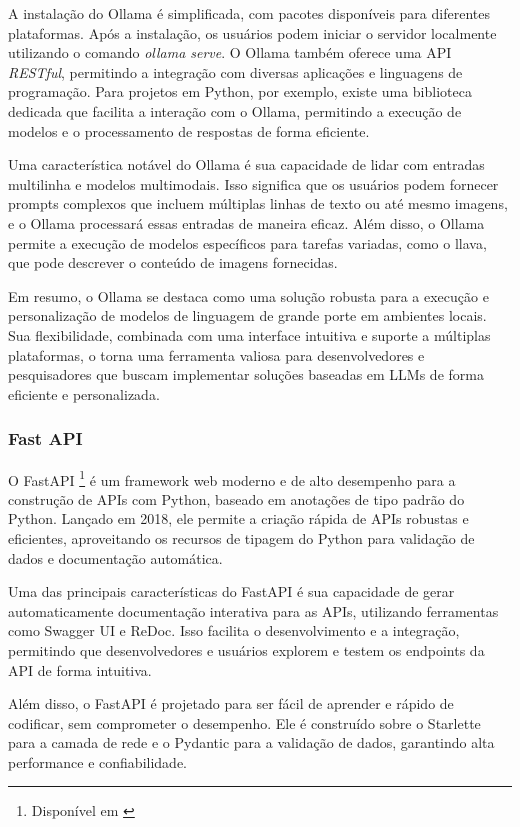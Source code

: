 \documentclass[a4paper, 12pt]{article}
\newcommand{\citeb}[1]{\bibleftbracket\cite{#1}\bibrightbracket}
\begin{document}
    A instalação do Ollama é simplificada, com pacotes disponíveis para diferentes plataformas. Após a instalação, os usuários podem iniciar o servidor localmente utilizando o comando \textit{ollama serve}. O Ollama também oferece uma API \textit{RESTful}, permitindo a integração com diversas aplicações e linguagens de programação. Para projetos em Python, por exemplo, existe uma biblioteca dedicada que facilita a interação com o Ollama, permitindo a execução de modelos e o processamento de respostas de forma eficiente.

    Uma característica notável do Ollama é sua capacidade de lidar com entradas multilinha e modelos multimodais. Isso significa que os usuários podem fornecer prompts complexos que incluem múltiplas linhas de texto ou até mesmo imagens, e o Ollama processará essas entradas de maneira eficaz. Além disso, o Ollama permite a execução de modelos específicos para tarefas variadas, como o llava, que pode descrever o conteúdo de imagens fornecidas.

    Em resumo, o Ollama se destaca como uma solução robusta para a execução e personalização de modelos de linguagem de grande porte em ambientes locais. Sua flexibilidade, combinada com uma interface intuitiva e suporte a múltiplas plataformas, o torna uma ferramenta valiosa para desenvolvedores e pesquisadores que buscam implementar soluções baseadas em LLMs de forma eficiente e personalizada.

    \subsubsection{Fast API} \label{sec:fastapi}

    O FastAPI \footnote{Disponível em \citeb{fastapi}} é um framework web moderno e de alto desempenho para a construção de APIs com Python, baseado em anotações de tipo padrão do Python. Lançado em 2018, ele permite a criação rápida de APIs robustas e eficientes, aproveitando os recursos de tipagem do Python para validação de dados e documentação automática.

    Uma das principais características do FastAPI é sua capacidade de gerar automaticamente documentação interativa para as APIs, utilizando ferramentas como Swagger UI e ReDoc. Isso facilita o desenvolvimento e a integração, permitindo que desenvolvedores e usuários explorem e testem os endpoints da API de forma intuitiva.

    Além disso, o FastAPI é projetado para ser fácil de aprender e rápido de codificar, sem comprometer o desempenho. Ele é construído sobre o Starlette para a camada de rede e o Pydantic para a validação de dados, garantindo alta performance e confiabilidade.
\end{document}
